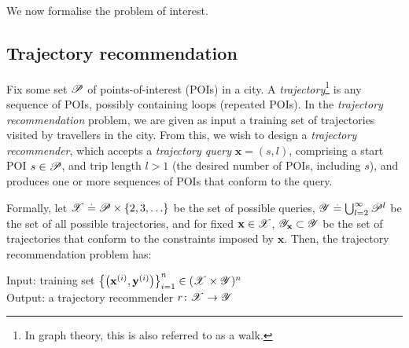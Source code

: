 
We now formalise the problem of interest.

%
\subsection{Trajectory recommendation}

Fix some set $\mathscr{P}$ of points-of-interest (POIs) in a city.
A \emph{trajectory}\footnote{In graph theory, this is also referred to as a walk.} is any sequence of POIs, possibly containing loops (repeated POIs).
In the \emph{trajectory recommendation} problem, we are given as input a training set of trajectories visited by travellers in the city.
From this, we wish to design a \emph{trajectory recommender}, which accepts a
\emph{trajectory query} $\mathbf{x} = (s, l)$, comprising a start POI $s \in \mathscr{P}$, and trip length $l \!>\! 1$ (\ie the desired number of POIs, including $s$),
and produces one or more sequences of POIs that conform to the query.

Formally, let $\mathscr{X} \stackrel{.}{=} \mathscr{P} \times \{ 2, 3, \ldots \}$ be the set of possible queries,
$\mathscr{Y} \stackrel{.}{=} \bigcup_{l = 2}^\infty \mathscr{P}^l$ be the set of all possible trajectories,
and for fixed $\mathbf{x} \in \mathscr{X}$, $\mathscr{Y}_{\mathbf{x}} \subset \mathscr{Y}$ be the set of trajectories that conform to the constraints imposed by $\mathbf{x}$.
Then, the {trajectory recommendation} problem has:

\vspace{0.5\baselineskip}

\begin{mdframed}[innertopmargin=3pt,innerbottommargin=3pt,skipbelow=5pt,roundcorner=8pt,backgroundcolor=red!3,topline=false,rightline=false,leftline=false,bottomline=false]
{\sc Input}: training set $\left\{ \left( \mathbf{x}^{(i)}, \mathbf{y}^{(i)} \right) \right\}_{i = 1}^n \in ( \mathscr{X} \times \mathscr{Y} )^n$ \\
{\sc Output}: a trajectory recommender $r \colon \mathscr{X} \to \mathscr{Y}$ 
\end{mdframed}

\vspace{0.5\baselineskip}

